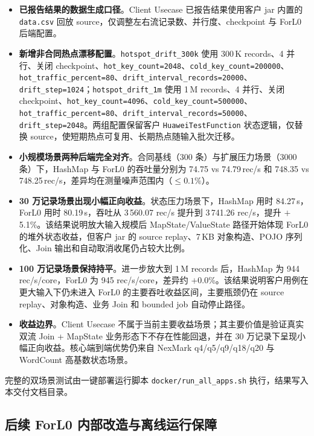 \documentclass[a4paper,11pt]{article}
\begin{document}
\begin{itemize}
  \item \textbf{已报告结果的数据生成口径}。Client Usecase 已报告结果使用客户 jar 内置的 \texttt{data.csv} 回放 source，仅调整左右流记录数、并行度、checkpoint 与 ForL0 后端配置。
  \item \textbf{新增非合同热点漂移配置}。\texttt{hotspot\_drift\_300k} 使用 300\,K records、4 并行、关闭 checkpoint、\texttt{hot\_key\_count=2048}、\texttt{cold\_key\_count=200000}、\texttt{hot\_traffic\_percent=80}、\texttt{drift\_interval\_records=20000}、\texttt{drift\_step=1024}；\texttt{hotspot\_drift\_1m} 使用 1\,M records、4 并行、关闭 checkpoint、\texttt{hot\_key\_count=4096}、\texttt{cold\_key\_count=500000}、\texttt{hot\_traffic\_percent=80}、\texttt{drift\_interval\_records=50000}、\texttt{drift\_step=2048}。两组配置保留客户 \texttt{HuaweiTestFunction} 状态逻辑，仅替换 source，使短期热点可复用、长期热点随输入批次迁移。
  \item \textbf{小规模场景两种后端完全对齐}。合同基线（300 条）与扩展压力场景（3000 条）下，HashMap 与 ForL0 的吞吐量分别为 74.75 vs 74.79\,rec/s 和 748.35 vs 748.25\,rec/s，差异均在测量噪声范围内（$\leq 0.1\%$）。
  \item \textbf{30 万记录场景出现小幅正向收益}。状态压力场景下，HashMap 用时 84.27\,s，ForL0 用时 80.19\,s，吞吐从 3\,560.07 rec/s 提升到 3\,741.26 rec/s，提升 $+$5.1\%。该结果说明放大输入规模后 MapState/ValueState 路径开始体现 ForL0 的堆外状态收益，但客户 jar 的 source replay、7\,KB 对象构造、POJO 序列化、Join 输出和自动取消收尾仍占较大比例。
  \item \textbf{100 万记录场景保持持平}。进一步放大到 1\,M records 后，HashMap 为 944 rec/s/core，ForL0 为 945 rec/s/core，差异约 $+$0.0\%。该结果说明客户用例在更大输入下仍未进入 ForL0 的主要吞吐收益区间，主要瓶颈仍在 source replay、对象构造、业务 Join 和 bounded job 自动停止路径。
  \item \textbf{收益边界}。Client Usecase 不属于当前主要收益场景；其主要价值是验证真实双流 Join + MapState 业务形态下不存在性能回退，并在 30 万记录下呈现小幅正向收益。核心端到端优势仍来自 NexMark q4/q5/q9/q18/q20 与 WordCount 高基数状态场景。
\end{itemize}

完整的双场景测试由一键部署运行脚本 \texttt{docker/run\_all\_apps.sh} 执行，结果写入本交付文档目录。

\subsection{后续 ForL0 内部改造与离线运行保障}
\end{document}
